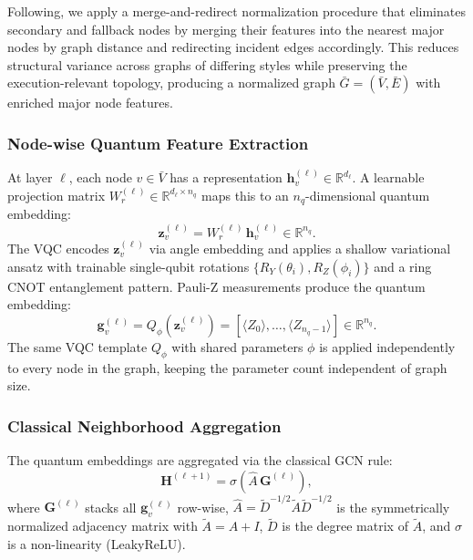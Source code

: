 \documentclass[journal]{IEEEtran}
\begin{document}
Following, we apply a merge-and-redirect normalization
procedure that eliminates secondary and fallback nodes by merging their
features into the nearest major nodes by graph distance and redirecting
incident edges accordingly. This reduces structural variance across graphs
of differing styles while preserving the execution-relevant topology,
producing a normalized graph $\bar{G} = (\bar{V}, \bar{E})$ with enriched
major node features.

\subsubsection{Node-wise Quantum Feature Extraction}

At layer $\ell$, each node $v \in \bar{V}$ has a representation
$\mathbf{h}_v^{(\ell)} \in \mathbb{R}^{d_\ell}$. A learnable
projection matrix $W_r^{(\ell)} \in \mathbb{R}^{d_\ell \times n_q}$
maps this to an $n_q$-dimensional quantum embedding:
\begin{equation}
  \mathbf{z}_v^{(\ell)} = W_r^{(\ell)}\,\mathbf{h}_v^{(\ell)}
  \in \mathbb{R}^{n_q}.
  \label{eq:proj}
\end{equation}
The VQC encodes $\mathbf{z}_v^{(\ell)}$ via angle embedding and applies
a shallow variational ansatz with trainable single-qubit rotations
$\{R_Y(\theta_i), R_Z(\phi_i)\}$ and a ring CNOT entanglement pattern.
Pauli-Z measurements produce the quantum embedding:
\begin{equation}
  \mathbf{g}_v^{(\ell)} = Q_\phi\!\left(\mathbf{z}_v^{(\ell)}\right)
  = \left[\langle Z_0\rangle, \ldots, \langle Z_{n_q-1}\rangle\right]
  \in \mathbb{R}^{n_q}.
  \label{eq:vqc_qgcn}
\end{equation}
The same VQC template $Q_\phi$ with shared parameters $\phi$ is applied
independently to every node in the graph, keeping the parameter count
independent of graph size.

\subsubsection{Classical Neighborhood Aggregation}

The quantum embeddings are aggregated via the classical GCN rule:
\begin{equation}
  \mathbf{H}^{(\ell+1)} = \sigma\!\left(\hat{A}\,\mathbf{G}^{(\ell)}\right),
  \label{eq:gcn_agg}
\end{equation}
where $\mathbf{G}^{(\ell)}$ stacks all $\mathbf{g}_v^{(\ell)}$ row-wise,
$\hat{A} = \tilde{D}^{-1/2}\tilde{A}\tilde{D}^{-1/2}$ is the symmetrically
normalized adjacency matrix with $\tilde{A} = A + I$, $\tilde{D}$ is the
degree matrix of $\tilde{A}$, and $\sigma$ is a non-linearity (LeakyReLU).
\end{document}
